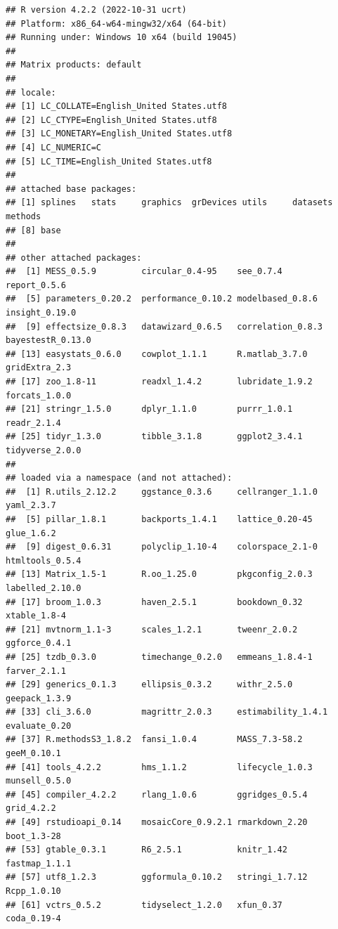 \documentclass[
]{book}
\begin{document}
\begin{verbatim}
## R version 4.2.2 (2022-10-31 ucrt)
## Platform: x86_64-w64-mingw32/x64 (64-bit)
## Running under: Windows 10 x64 (build 19045)
## 
## Matrix products: default
## 
## locale:
## [1] LC_COLLATE=English_United States.utf8 
## [2] LC_CTYPE=English_United States.utf8   
## [3] LC_MONETARY=English_United States.utf8
## [4] LC_NUMERIC=C                          
## [5] LC_TIME=English_United States.utf8    
## 
## attached base packages:
## [1] splines   stats     graphics  grDevices utils     datasets  methods  
## [8] base     
## 
## other attached packages:
##  [1] MESS_0.5.9         circular_0.4-95    see_0.7.4          report_0.5.6      
##  [5] parameters_0.20.2  performance_0.10.2 modelbased_0.8.6   insight_0.19.0    
##  [9] effectsize_0.8.3   datawizard_0.6.5   correlation_0.8.3  bayestestR_0.13.0 
## [13] easystats_0.6.0    cowplot_1.1.1      R.matlab_3.7.0     gridExtra_2.3     
## [17] zoo_1.8-11         readxl_1.4.2       lubridate_1.9.2    forcats_1.0.0     
## [21] stringr_1.5.0      dplyr_1.1.0        purrr_1.0.1        readr_2.1.4       
## [25] tidyr_1.3.0        tibble_3.1.8       ggplot2_3.4.1      tidyverse_2.0.0   
## 
## loaded via a namespace (and not attached):
##  [1] R.utils_2.12.2     ggstance_0.3.6     cellranger_1.1.0   yaml_2.3.7        
##  [5] pillar_1.8.1       backports_1.4.1    lattice_0.20-45    glue_1.6.2        
##  [9] digest_0.6.31      polyclip_1.10-4    colorspace_2.1-0   htmltools_0.5.4   
## [13] Matrix_1.5-1       R.oo_1.25.0        pkgconfig_2.0.3    labelled_2.10.0   
## [17] broom_1.0.3        haven_2.5.1        bookdown_0.32      xtable_1.8-4      
## [21] mvtnorm_1.1-3      scales_1.2.1       tweenr_2.0.2       ggforce_0.4.1     
## [25] tzdb_0.3.0         timechange_0.2.0   emmeans_1.8.4-1    farver_2.1.1      
## [29] generics_0.1.3     ellipsis_0.3.2     withr_2.5.0        geepack_1.3.9     
## [33] cli_3.6.0          magrittr_2.0.3     estimability_1.4.1 evaluate_0.20     
## [37] R.methodsS3_1.8.2  fansi_1.0.4        MASS_7.3-58.2      geeM_0.10.1       
## [41] tools_4.2.2        hms_1.1.2          lifecycle_1.0.3    munsell_0.5.0     
## [45] compiler_4.2.2     rlang_1.0.6        ggridges_0.5.4     grid_4.2.2        
## [49] rstudioapi_0.14    mosaicCore_0.9.2.1 rmarkdown_2.20     boot_1.3-28       
## [53] gtable_0.3.1       R6_2.5.1           knitr_1.42         fastmap_1.1.1     
## [57] utf8_1.2.3         ggformula_0.10.2   stringi_1.7.12     Rcpp_1.0.10       
## [61] vctrs_0.5.2        tidyselect_1.2.0   xfun_0.37          coda_0.19-4
\end{verbatim}
\end{document}
